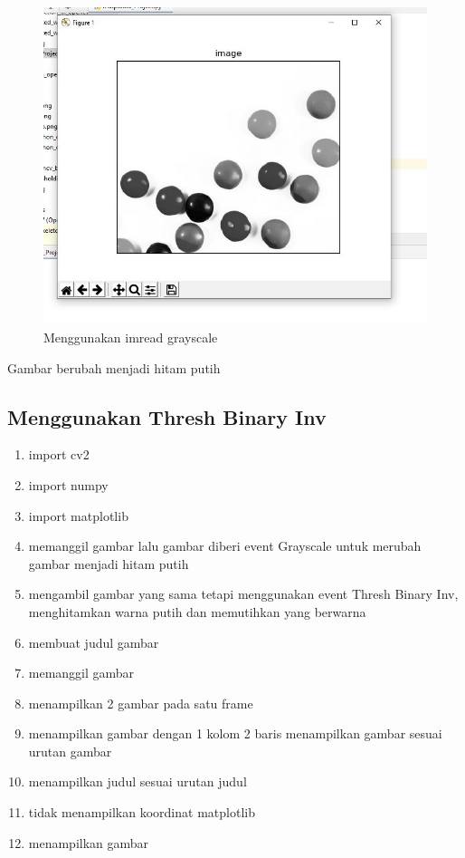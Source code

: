 \newpage
\begin{figure}[ht]
\centering
\includegraphics[scale=0.6]{figures/2,50.jpg}
\caption{Menggunakan imread grayscale}
\label{contoh}
\end{figure}
Gambar berubah menjadi hitam putih






\newpage
\subsection{Menggunakan Thresh Binary Inv}

\begin{enumerate}
	\item import cv2
	\item import numpy
	\item import matplotlib
	\item memanggil gambar lalu gambar diberi event Grayscale untuk merubah gambar menjadi hitam putih
	\item mengambil gambar yang sama tetapi menggunakan event Thresh Binary Inv, menghitamkan warna putih dan memutihkan yang berwarna
	\item membuat judul gambar
	\item memanggil gambar
	\item menampilkan 2 gambar pada satu frame
	\item menampilkan gambar dengan 1 kolom 2 baris menampilkan gambar sesuai urutan gambar
	\item menampilkan judul sesuai urutan judul
	\item tidak menampilkan koordinat matplotlib
	\item menampilkan gambar
\end{enumerate}

